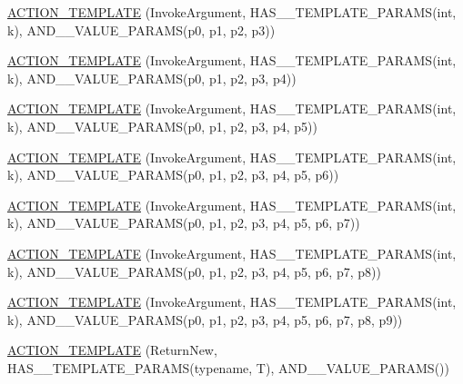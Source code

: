 \begin{DoxyCompactItemize}
\item 
\mbox{\hyperlink{namespacetesting_ae98e43eecf8f44990b39b460f00b397b}{A\+C\+T\+I\+O\+N\+\_\+\+T\+E\+M\+P\+L\+A\+TE}} (Invoke\+Argument, H\+A\+S\+\_\+\_\+\+T\+E\+M\+P\+L\+A\+T\+E\+\_\+\+P\+A\+R\+A\+MS(int, k), A\+N\+D\+\_\+\_\+\+V\+A\+L\+U\+E\+\_\+\+P\+A\+R\+A\+MS(p0, p1, p2, p3))
\item 
\mbox{\hyperlink{namespacetesting_a505f6d82df233802c5f4235d77dca164}{A\+C\+T\+I\+O\+N\+\_\+\+T\+E\+M\+P\+L\+A\+TE}} (Invoke\+Argument, H\+A\+S\+\_\+\_\+\+T\+E\+M\+P\+L\+A\+T\+E\+\_\+\+P\+A\+R\+A\+MS(int, k), A\+N\+D\+\_\+\_\+\+V\+A\+L\+U\+E\+\_\+\+P\+A\+R\+A\+MS(p0, p1, p2, p3, p4))
\item 
\mbox{\hyperlink{namespacetesting_ab85e5f54a209bf141fc04f8612fbe887}{A\+C\+T\+I\+O\+N\+\_\+\+T\+E\+M\+P\+L\+A\+TE}} (Invoke\+Argument, H\+A\+S\+\_\+\_\+\+T\+E\+M\+P\+L\+A\+T\+E\+\_\+\+P\+A\+R\+A\+MS(int, k), A\+N\+D\+\_\+\_\+\+V\+A\+L\+U\+E\+\_\+\+P\+A\+R\+A\+MS(p0, p1, p2, p3, p4, p5))
\item 
\mbox{\hyperlink{namespacetesting_a8d3590561f334d165c620f522219831b}{A\+C\+T\+I\+O\+N\+\_\+\+T\+E\+M\+P\+L\+A\+TE}} (Invoke\+Argument, H\+A\+S\+\_\+\_\+\+T\+E\+M\+P\+L\+A\+T\+E\+\_\+\+P\+A\+R\+A\+MS(int, k), A\+N\+D\+\_\+\_\+\+V\+A\+L\+U\+E\+\_\+\+P\+A\+R\+A\+MS(p0, p1, p2, p3, p4, p5, p6))
\item 
\mbox{\hyperlink{namespacetesting_a8725892aafb62cc8f6f76280d29595d8}{A\+C\+T\+I\+O\+N\+\_\+\+T\+E\+M\+P\+L\+A\+TE}} (Invoke\+Argument, H\+A\+S\+\_\+\_\+\+T\+E\+M\+P\+L\+A\+T\+E\+\_\+\+P\+A\+R\+A\+MS(int, k), A\+N\+D\+\_\+\_\+\+V\+A\+L\+U\+E\+\_\+\+P\+A\+R\+A\+MS(p0, p1, p2, p3, p4, p5, p6, p7))
\item 
\mbox{\hyperlink{namespacetesting_a910551adbfeb1854071ef55ae54a5c0f}{A\+C\+T\+I\+O\+N\+\_\+\+T\+E\+M\+P\+L\+A\+TE}} (Invoke\+Argument, H\+A\+S\+\_\+\_\+\+T\+E\+M\+P\+L\+A\+T\+E\+\_\+\+P\+A\+R\+A\+MS(int, k), A\+N\+D\+\_\+\_\+\+V\+A\+L\+U\+E\+\_\+\+P\+A\+R\+A\+MS(p0, p1, p2, p3, p4, p5, p6, p7, p8))
\item 
\mbox{\hyperlink{namespacetesting_ab7bf885ff274cbdc09f19c39e43b7f2b}{A\+C\+T\+I\+O\+N\+\_\+\+T\+E\+M\+P\+L\+A\+TE}} (Invoke\+Argument, H\+A\+S\+\_\+\_\+\+T\+E\+M\+P\+L\+A\+T\+E\+\_\+\+P\+A\+R\+A\+MS(int, k), A\+N\+D\+\_\+\_\+\+V\+A\+L\+U\+E\+\_\+\+P\+A\+R\+A\+MS(p0, p1, p2, p3, p4, p5, p6, p7, p8, p9))
\item 
\mbox{\hyperlink{namespacetesting_a468e601467d018ab7566f321d3f7e871}{A\+C\+T\+I\+O\+N\+\_\+\+T\+E\+M\+P\+L\+A\+TE}} (Return\+New, H\+A\+S\+\_\+\_\+\+T\+E\+M\+P\+L\+A\+T\+E\+\_\+\+P\+A\+R\+A\+MS(typename, T), A\+N\+D\+\_\+\_\+\+V\+A\+L\+U\+E\+\_\+\+P\+A\+R\+A\+MS())

\end{DoxyCompactItemize}
